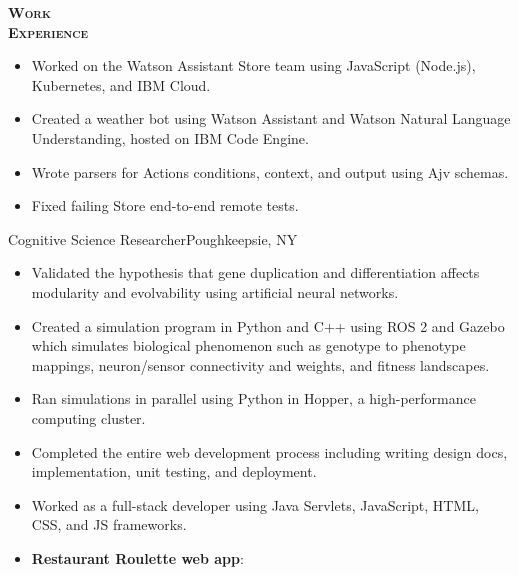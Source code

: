 \documentclass[12pt]{article}
\begin{document}
\begin{minipage}[t]{0.15\textwidth}\vspace{-0.5em}%
  {\color{Red} \textbf{\textsc{Work\\Experience}}}
\end{minipage}
\hfill
\begin{minipage}[t]{0.82\textwidth}\vspace{-0.5em}%
  \begin{itemize}
    \item Worked on the Watson Assistant Store team using JavaScript (Node.js),
      Kubernetes, and IBM Cloud.
    \item Created a weather bot using Watson Assistant and Watson Natural
      Language Understanding, hosted on IBM Code Engine.
    \item Wrote parsers for Actions conditions, context, and output using Ajv
      schemas.
    \item Fixed failing Store end-to-end remote tests.
  \end{itemize}
  \vspace{0.5em}
    {Cognitive Science Researcher}{Poughkeepsie, NY}
  \begin{itemize}
    \item Validated the hypothesis that gene duplication and
      differentiation affects modularity and evolvability using
      artificial neural networks.
    \item Created a simulation program in Python and C++ using ROS 2 and Gazebo
      which simulates biological phenomenon such as genotype to phenotype
      mappings, neuron/sensor connectivity and weights, and fitness landscapes.
    \item Ran simulations in parallel using Python in Hopper, a
      high-performance computing cluster.
  \end{itemize}
  \vspace{0.5em}
  \begin{itemize}
    \item Completed the entire web development process including writing design
      docs, implementation, unit testing, and deployment.
    \item Worked as a full-stack developer using Java Servlets, JavaScript,
      HTML, CSS, and JS frameworks.
    \item \textbf{Restaurant Roulette web app}:

\end{itemize}
\end{minipage}
\end{document}
